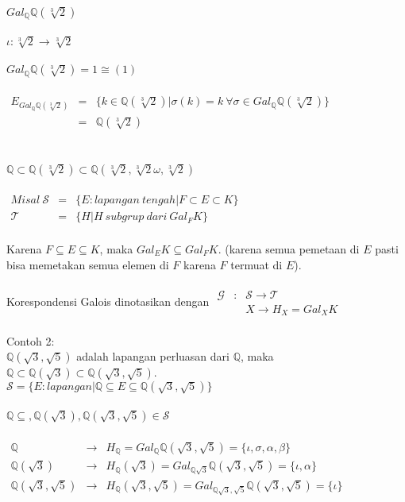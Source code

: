 $Gal_{\mathbb{Q}}\mathbb{Q}(\sqrt[3]{2})$\\ \\
$\iota:\sqrt[3]{2} \to \sqrt[3]{2}$\\ \\
$Gal_{\mathbb{Q}}\mathbb{Q}(\sqrt[3]{2})={1} \cong (1)$\\ \\
$\begin{array}{rcl}
E_{Gal_{\mathbb{Q}}\mathbb{Q}(\sqrt[3]{2})}&=&\{k \in \mathbb{Q}(\sqrt[3]{2})|\sigma(k)=k~\forall \sigma \in Gal_{\mathbb{Q}}\mathbb{Q}(\sqrt[3]{2})\} \\
&=&\mathbb{Q}(\sqrt[3]{2})
\end{array}$\\ \\ \\
$\mathbb{Q} \subset \mathbb{Q}(\sqrt[3]{2}) \subset \mathbb{Q}(\sqrt[3]{2},\sqrt[3]{2}\omega,\sqrt[3]{2})$\\ \\
$\begin{array}{rcl}
Misal~\mathcal{S}&=&\{E:lapangan~tengah|F \subset E \subset K\}\\
\mathcal{T}&=&\{H|H~subgrup~dari~Gal_FK\}
\end{array}$\\ \\
Karena $F \subseteq E \subseteq K$, maka $Gal_EK \subseteq Gal_FK$. (karena semua pemetaan di $E$ pasti bisa memetakan semua elemen di $F$ karena $F$ termuat di $E$).\\ \\
Korespondensi Galois dinotasikan dengan $\begin{array}{rcl}
\mathcal{G}&:&\mathcal{S} \to \mathcal{T}\\
& &X \to H_X=Gal_XK
\end{array}$\\ \\
Contoh 2:\\
$\mathbb{Q}(\sqrt{3},\sqrt{5})$ adalah lapangan perluasan dari $\mathbb{Q}$, maka $\mathbb{Q} \subset \mathbb{Q}(\sqrt{3}) \subset \mathbb{Q}(\sqrt{3},\sqrt{5})$.\\
$\mathcal{S}=\{E:lapangan|\mathbb{Q} \subseteq E \subseteq \mathbb{Q}(\sqrt{3},\sqrt{5})\}$\\ \\
$\mathbb{Q} \subseteq, \mathbb{Q}(\sqrt{3}), \mathbb{Q}(\sqrt{3},\sqrt{5}) \in \mathcal{S}$\\ \\
$\begin{array}{rcl}
\mathbb{Q} &\to& H_{\mathbb{Q}}=Gal_{\mathbb{Q}}\mathbb{Q}(\sqrt{3},\sqrt{5})=\{\iota,\sigma,\alpha,\beta\}\\
\mathbb{Q}(\sqrt{3}) &\to& H_{\mathbb{Q}}(\sqrt{3})=Gal_{\mathbb{Q}\sqrt{3}}\mathbb{Q}(\sqrt{3},\sqrt{5})=\{\iota,\alpha\}\\
\mathbb{Q}(\sqrt{3},\sqrt{5}) &\to& H_{\mathbb{Q}}(\sqrt{3},\sqrt{5})=Gal_{\mathbb{Q}\sqrt{3},\sqrt{5}}\mathbb{Q}(\sqrt{3},\sqrt{5})=\{\iota\}
\end{array}$\\ \\
